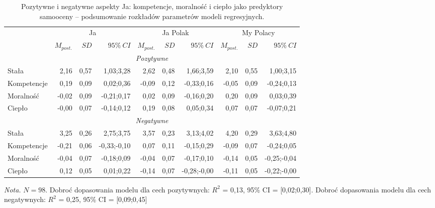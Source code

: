 \documentclass[man]{apa6}
\begin{document}
\begin{table*}[htbp]
\vspace*{2em}
\centering
\begin{threeparttable}
\caption{Pozytywne i negatywne aspekty Ja: kompetencje, moralność i ciepło jako predyktory samooceny -- podsumowanie rozkładów parametrów modeli regresyjnych.}
\label{tab:1}
\bgroup
\def\tabcolsep{4pt}
\begin{tabular}{lrrrrrrrrr}
\midrule
 &
\multicolumn{3}{c}{Ja} &
\multicolumn{3}{c}{Ja Polak} &
\multicolumn{3}{c}{My Polacy} \\
\cline{2-10}
 & $M_{post.}$    & $SD$   & $95\%\ CI$   & $M_{post.}$    & $SD$   & $95\%\ CI$   & $M_{post.}$    & $SD$   & $95\%\ CI$   \\
\midrule
 \multicolumn{10}{c}{\emph{Pozytywne}}  \\
 Stała       &  2,16 & 0,57 &  1,03;3,28 &  2,62 & 0,48 &  1,66;3,59 &  2,10 & 0,55 &  1,00;3,15 \\
 Kompetencje &  0,19 & 0,09 &  0,02;0,36 & -0,09 & 0,12 & -0,33;0,16 & -0,05 & 0,09 & -0,24;0,13 \\
 Moralność   & -0,02 & 0,09 & -0,21;0,17 &  0,02 & 0,09 & -0,16;0,20 &  0,20 & 0,09 &  0,03;0,39 \\
 Ciepło      & -0,00 & 0,07 & -0,14;0,12 &  0,19 & 0,08 &  0,05;0,34 &  0,07 & 0,07 & -0,07;0,21 \\
 \multicolumn{10}{c}{\emph{Negatywne}}  \\
 Stała       &  3,25 & 0,26 &  2,75;3,75 &  3,57 & 0,23 &  3,13;4,02 &  4,20  & 0,29 & 3,63;4,80 \\
 Kompetencje & -0,21 & 0,06 & -0,33;-0,10 &  0,07 & 0,11 & -0,15;0,29 & -0,09 & 0,07 & -0,24;0,05 \\
 Moralność   & -0,04 & 0,07 & -0,18;0,09 & -0,04 & 0,07 & -0,17;0,10 & -0,14 & 0,05 & -0,25;-0,04 \\
 Ciepło      &  0,12 & 0,05 &  0,01;0,22 & -0,14 & 0,07 & -0,28;-0,00& -0,11 & 0,05 & -0,22;-0,00 \\
\bottomrule
\end{tabular}
\egroup
\begin{tablenotes}
{\small
\textit{Nota.} $N = 98$. Dobroć dopasowania modelu dla cech pozytywnych: $R^2$ = 0,13, 95\% CI = [0,02;0,30]. Dobroć dopasowania modelu dla cech negatywnych: $R^2$ = 0,25, 95\% CI = [0,09;0,45]
}
\end{tablenotes}
\end{threeparttable}
\end{table*}
\end{document}
